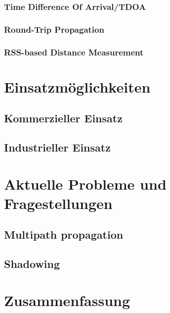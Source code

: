\documentclass[12pt, a4wide]{scrreprt}
\begin{document}
    \subsection{Time Difference Of Arrival/TDOA}
    \subsection{Round-Trip Propagation}
    \subsection{RSS-based Distance Measurement}    

\chapter{Einsatzmöglichkeiten}
  \section{Kommerzieller Einsatz}
  \section{Industrieller Einsatz}

\chapter{Aktuelle Probleme und Fragestellungen}
  \section{Multipath propagation}
  \section{Shadowing}

\chapter{Zusammenfassung}

\newpage
%


\begin{multicols}{2}

\nocite{*}
\end{multicols}
\end{document}
